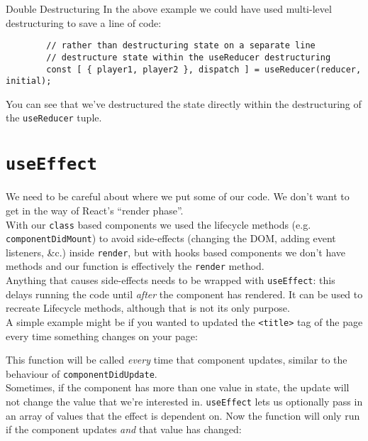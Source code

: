 \begin{infobox}{Double Destructuring}
    In the above example we could have used multi-level destructuring to save a line of code:

    \begin{verbatim}
        // rather than destructuring state on a separate line
        // destructure state within the useReducer destructuring
        const [ { player1, player2 }, dispatch ] = useReducer(reducer, initial);
    \end{verbatim}

    You can see that we've destructured the state directly within the destructuring of the \texttt{useReducer} tuple.
\end{infobox}


\section{\texttt{useEffect}}

We need to be careful about where we put some of our code. We don't want to get in the way of React's ``render phase''.
\\

With our \texttt{class} based components we used the lifecycle methods (e.g. \\ \texttt{componentDidMount}) to avoid side-effects (changing the DOM, adding event listeners, \&c.) inside \texttt{render}, but with hooks based components we don't have methods and our function is effectively the \texttt{render} method.
\\

Anything that causes side-effects needs to be wrapped with \texttt{useEffect}: this delays running the code until \textit{after} the component has rendered. It can be used to recreate Lifecycle methods, although that is not its only purpose.
\\

A simple example might be if you wanted to updated the \texttt{<title>} tag of the page every time something changes on your page:


This function will be called \textit{every} time that component updates, similar to the behaviour of \texttt{componentDidUpdate}.
\\

Sometimes, if the component has more than one value in state, the update will not change the value that we're interested in. \texttt{useEffect} lets us optionally pass in an array of values that the effect is dependent on. Now the function will only run if the component updates \textit{and} that value has changed:

